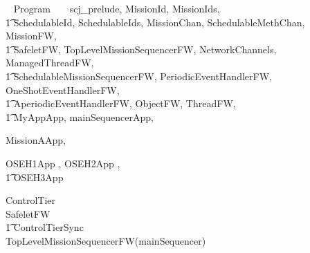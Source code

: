 
%
\begin{zsection}
  \SECTION ~ Program ~ \parents ~ scj\_prelude, MissionId, MissionIds, \\
  \t1 SchedulableId, SchedulableIds, MissionChan, SchedulableMethChan, MissionFW,\\
  \t1 SafeletFW, TopLevelMissionSequencerFW, NetworkChannels, ManagedThreadFW, \\
  \t1 SchedulableMissionSequencerFW, PeriodicEventHandlerFW, OneShotEventHandlerFW,\\
  \t1 AperiodicEventHandlerFW, ObjectFW, ThreadFW, \\
  \t1 MyAppApp, mainSequencerApp,

MissionAApp,

OSEH1App
	,
OSEH2App
	,
\\ \t1
OSEH3App
	
	
	
\end{zsection}
%
\begin{circus}
\circprocess ControlTier \circdef \\
\circblockopen
SafeletFW \\
\t1 \lpar ControlTierSync \rpar \\
TopLevelMissionSequencerFW(mainSequencer)
\circblockclose
\end{circus}
%


